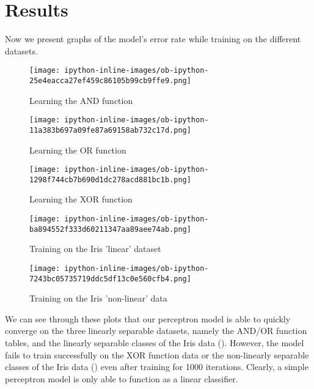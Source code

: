 \documentclass[11pt,a4paper]{article}
\begin{document}
\section{Results}
\label{sec:org6c0f29d}

Now we present graphs of the model's error rate while training on the different datasets.

\begin{figure}[htbp]
\centering
\texttt{[image: ipython-inline-images/ob-ipython-25e4eacca27ef459c86105b99cb9ffe9.png]}
\caption{\label{fig-1}
Learning the AND function}
\end{figure}


\begin{figure}[htbp]
\centering
\texttt{[image: ipython-inline-images/ob-ipython-11a383b697a09fe87a69158ab732c17d.png]}
\caption{\label{fig-2}
Learning the OR function}
\end{figure}


\begin{figure}[htbp]
\centering
\texttt{[image: ipython-inline-images/ob-ipython-1298f744cb7b690d1dc278acd881bc1b.png]}
\caption{\label{fig-3}
Learning the XOR function}
\end{figure}

\begin{figure}[htbp]
\centering
\texttt{[image: ipython-inline-images/ob-ipython-ba894552f333d60211347aa89aee74ab.png]}
\caption{\label{fig-4}
Training on the Iris 'linear' dataset}
\end{figure}

\begin{figure}[htbp]
\centering
\texttt{[image: ipython-inline-images/ob-ipython-7243bc05735719ddc5df13c0e560cfb4.png]}
\caption{\label{fig-5}
Training on the Iris 'non-linear' data}
\end{figure}


We can see through these plots that our perceptron model is able to quickly converge on the three linearly separable datasets, namely the AND/OR function tables, and the linearly separable classes of the Iris data (). However, the model fails to train successfully on the XOR function data or the non-linearly separable classes of the Iris data () even after training for 1000 iterations. Clearly, a simple perceptron model is only able to function as a linear classifier.



\end{document}
